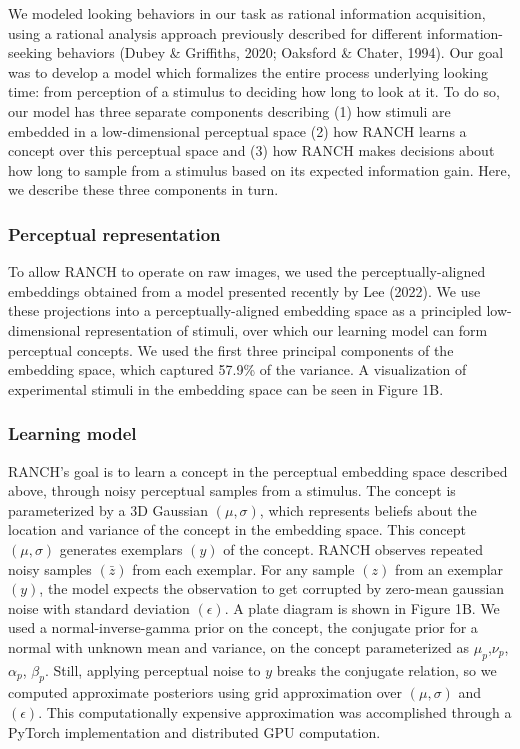 \documentclass[10pt, letterpaper]{article}
\begin{document}
We modeled looking behaviors in our task as rational information
acquisition, using a rational analysis approach previously described for
different information-seeking behaviors (Dubey \& Griffiths, 2020;
Oaksford \& Chater, 1994). Our goal was to develop a model which
formalizes the entire process underlying looking time: from perception
of a stimulus to deciding how long to look at it. To do so, our model
has three separate components describing (1) how stimuli are embedded in
a low-dimensional perceptual space (2) how RANCH learns a concept over
this perceptual space and (3) how RANCH makes decisions about how long
to sample from a stimulus based on its expected information gain. Here,
we describe these three components in turn.

\hypertarget{perceptual-representation}{%
\subsubsection{Perceptual
representation}\label{perceptual-representation}}

To allow RANCH to operate on raw images, we used the
perceptually-aligned embeddings obtained from a model presented recently
by Lee (2022). We use these projections into a perceptually-aligned
embedding space as a principled low-dimensional representation of
stimuli, over which our learning model can form perceptual concepts. We
used the first three principal components of the embedding space, which
captured 57.9\% of the variance. A visualization of experimental stimuli
in the embedding space can be seen in Figure 1B.

\hypertarget{learning-model}{%
\subsubsection{Learning model}\label{learning-model}}

RANCH's goal is to learn a concept in the perceptual embedding space
described above, through noisy perceptual samples from a stimulus. The
concept is parameterized by a 3D Gaussian \((\mu,\sigma)\), which
represents beliefs about the location and variance of the concept in the
embedding space. This concept \((\mu,\sigma)\) generates exemplars
\((y)\) of the concept. RANCH observes repeated noisy samples
\((\bar{z})\) from each exemplar. For any sample \((z)\) from an
exemplar \((y)\), the model expects the observation to get corrupted by
zero-mean gaussian noise with standard deviation \((\epsilon)\). A plate
diagram is shown in Figure 1B. We used a normal-inverse-gamma prior on
the concept, the conjugate prior for a normal with unknown mean and
variance, on the concept parameterized as
\(\mu_{p}\),\(\nu_{p}\),\(\alpha_{p}\), \(\beta_{p}\). Still, applying
perceptual noise to \(y\) breaks the conjugate relation, so we computed
approximate posteriors using grid approximation over \((\mu,\sigma)\)
and \((\epsilon)\). This computationally expensive approximation was
accomplished through a PyTorch implementation and distributed GPU
computation.
\end{document}
